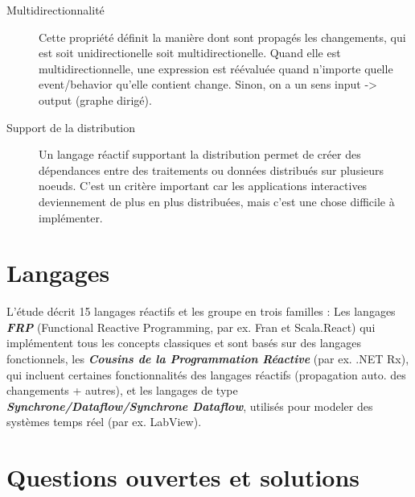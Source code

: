 \documentclass[10pt,final]{IEEEtran}
\begin{document}
\begin{description}
    \item[Multidirectionnalité]
    Cette propriété définit la manière dont sont propagés les changements, qui est soit unidirectionelle soit multidirectionelle. Quand elle est multidirectionnelle, une expression est réévaluée quand n'importe quelle event/behavior qu'elle contient change. Sinon, on a un sens input -> output (graphe dirigé).
    
    \item[Support de la distribution]
    Un langage réactif supportant la distribution permet de créer des dépendances entre des traitements ou données distribués sur plusieurs noeuds. C'est un critère important car les applications interactives deviennement de plus en plus distribuées, mais c'est une chose difficile à implémenter.
\end{description}


\section{Langages}

L'étude décrit 15 langages réactifs et les groupe en trois familles : Les langages \textit{\textbf{FRP}} (Functional Reactive Programming, par ex. Fran et Scala.React) qui implémentent tous les concepts classiques et sont basés sur des langages fonctionnels, les \textit{\textbf{Cousins de la Programmation Réactive}} (par ex. .NET Rx), qui incluent certaines fonctionnalités des langages réactifs (propagation auto. des changements + autres), et les langages de type \textit{\textbf{Synchrone/Dataflow/Synchrone Dataflow}}, utilisés pour modeler des systèmes temps réel (par ex. LabView). 

\section{Questions ouvertes et solutions}
\end{document}
